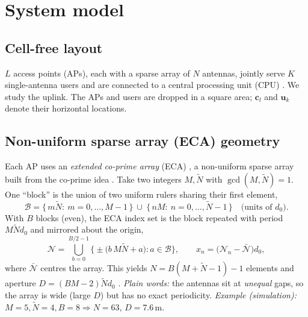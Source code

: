 \documentclass[11pt]{article}
\begin{document}
\section{System model}

\subsection{Cell-free layout}
$L$ access points (APs), each with a sparse array of $N$ antennas, jointly serve $K$
single-antenna users and are connected to a central processing unit (CPU)
\cite{ngo2017cellfree,bjornson2020scalable}. We study the uplink. The APs and users are dropped in
a square area; $\mathbf{c}_l$ and $\mathbf{u}_k$ denote their horizontal locations.

\subsection{Non-uniform sparse array (ECA) geometry}
Each AP uses an \emph{extended co-prime array} (ECA) \cite{zhou2025sparse}, a non-uniform sparse
array built from the co-prime idea \cite{vaidyanathan2011coprime}. Take two integers $M,\tilde N$
with $\gcd(M,\tilde N)=1$. One ``block'' is the union of two uniform rulers sharing their first
element,
\begin{equation}
\mathcal{B}=\{\,m\tilde N:\ m=0,\dots,M-1\,\}\ \cup\ \{\,n M:\ n=0,\dots,\tilde N-1\,\}
\quad\text{(units of }d_0\text{)}.
\label{eq:block}
\end{equation}
With $B$ blocks (even), the ECA index set is the block repeated with period $M\tilde N d_0$ and
mirrored about the origin,
\begin{equation}
\mathcal{N}=\bigcup_{b=0}^{B/2-1}\Big\{\pm\big(b\,M\tilde N + a\big):a\in\mathcal{B}\Big\},
\qquad
x_n=\big(\mathcal{N}_n-\bar{\mathcal N}\big)d_0,
\label{eq:eca}
\end{equation}
where $\bar{\mathcal N}$ centres the array. This yields $N=B(M+\tilde N-1)-1$ elements and aperture
$D=(BM-2)\tilde N d_0$ \cite{zhou2025sparse}. \emph{Plain words:} the antennas sit at
\emph{unequal} gaps, so the array is wide (large $D$) but has no exact periodicity.
\emph{Example (simulation):} $M=5,\tilde N=4,B=8\Rightarrow N=63$, $D=7.6$\,m.
\end{document}
